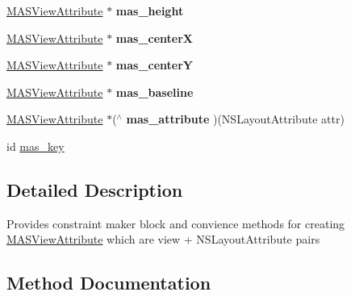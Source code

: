 \begin{DoxyCompactItemize}
\mbox{\label{category_m_a_s___v_i_e_w_07_m_a_s_additions_08_a6bcb5220fe990858aae0210d0dbbb551}} 
\mbox{\hyperlink{interface_m_a_s_view_attribute}{M\+A\+S\+View\+Attribute}} $\ast$ {\bfseries mas\+\_\+height}
\item 
\mbox{\label{category_m_a_s___v_i_e_w_07_m_a_s_additions_08_a73e9608849a87fb974b83311534d2108}} 
\mbox{\hyperlink{interface_m_a_s_view_attribute}{M\+A\+S\+View\+Attribute}} $\ast$ {\bfseries mas\+\_\+centerX}
\item 
\mbox{\label{category_m_a_s___v_i_e_w_07_m_a_s_additions_08_a61ef37d42a6ebe2a01db8f34a80f3824}} 
\mbox{\hyperlink{interface_m_a_s_view_attribute}{M\+A\+S\+View\+Attribute}} $\ast$ {\bfseries mas\+\_\+centerY}
\item 
\mbox{\label{category_m_a_s___v_i_e_w_07_m_a_s_additions_08_aac48f2227732fe2f1c7ea9c32dec1da1}} 
\mbox{\hyperlink{interface_m_a_s_view_attribute}{M\+A\+S\+View\+Attribute}} $\ast$ {\bfseries mas\+\_\+baseline}
\item 
\mbox{\label{category_m_a_s___v_i_e_w_07_m_a_s_additions_08_ad21d516d31be49ebc4d44c7b4600ece1}} 
\mbox{\hyperlink{interface_m_a_s_view_attribute}{M\+A\+S\+View\+Attribute}} $\ast$($^\wedge$ {\bfseries mas\+\_\+attribute} )(N\+S\+Layout\+Attribute attr)
\item 
id \mbox{\hyperlink{category_m_a_s___v_i_e_w_07_m_a_s_additions_08_a1e51b750fbe051f1fd163a30c3ec3707}{mas\+\_\+key}}
\end{DoxyCompactItemize}


\subsection{Detailed Description}
Provides constraint maker block and convience methods for creating \mbox{\hyperlink{interface_m_a_s_view_attribute}{M\+A\+S\+View\+Attribute}} which are view + N\+S\+Layout\+Attribute pairs 

\subsection{Method Documentation}
\mbox{\label{category_m_a_s___v_i_e_w_07_m_a_s_additions_08_a2250c9c7f218a7db066e3455d4fe8427}} 
